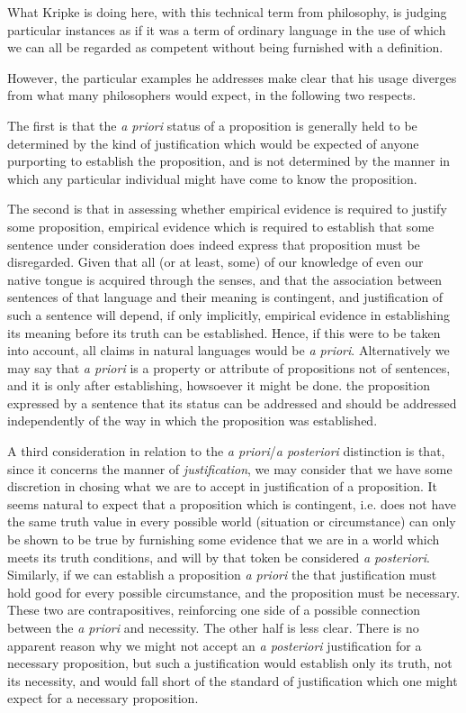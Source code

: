 What Kripke is doing here, with this technical term from philosophy,
is judging particular instances as if it was a term of ordinary language
in the use of which we can all be regarded as competent without being
furnished with a definition.

However, the particular examples he addresses make clear that his usage
diverges from what many philosophers would expect, in the following two
respects.

The first is that the \emph{a priori} status of a proposition is generally
held to be determined by the kind of justification which would be expected
of anyone purporting to establish the proposition, and is not determined
by the manner in which any particular individual might have come to know
the proposition.

The second is that in assessing whether empirical evidence is required
to justify some proposition, empirical evidence which is required to establish
that some sentence under consideration does indeed express that proposition
must be disregarded.
Given that all (or at least, some) of our knowledge of even our native tongue
is acquired through the senses, and that the association between sentences
of that language and their meaning is contingent, and justification of such
a sentence will depend, if only implicitly, empirical evidence in establishing
its meaning before its truth can be established.
Hence, if this were to be taken into account, all claims in natural languages
would be \emph{a priori}.
Alternatively we may say that \emph{a priori} is a property or attribute of
propositions not of sentences, and it is only after establishing, howsoever it might be done.
the proposition expressed by a sentence that its status can be addressed
and should be addressed independently of the way in which the proposition
was established.

A third consideration in relation to the \emph{a priori}/\emph{a posteriori}
distinction is that, since it concerns the manner of \emph{justification},
we may consider that we have some discretion in chosing what we are to accept
in justification of a proposition.
It seems natural to expect that a proposition which is contingent,
i.e. does not have the same truth value in every possible world (situation or circumstance)
can only be shown to be true by furnishing some evidence that we are in a world
which meets its truth conditions, and will by that token be considered \emph{a posteriori}.
Similarly, if we can establish a proposition \emph{a priori} the that justification
must hold good for every possible circumstance, and the proposition must be necessary.
These two are contrapositives, reinforcing one side of a possible connection between
the \emph{a priori} and necessity.
The other half is less clear.
There is no apparent reason why we might not accept an \emph{a posteriori} justification
for a necessary proposition, but such a justification would establish only its truth,
not its necessity, and would fall short of the standard of justification which one
might expect for a necessary proposition.

